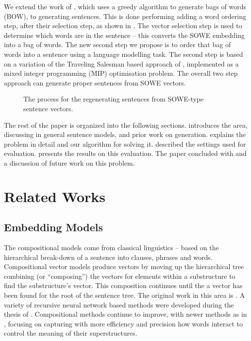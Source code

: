 \documentclass[11pt]{article}
\theoremstyle{plain}
\theoremstyle{definition}
\begin{document}
We extend the work of \textcite{White2015BOWgen}, which uses a greedy algorithm to generate bags of words (BOW), to generating sentences. This is done performing adding a word ordering step, after their selection step, as shown in . The vector selection step is used to determine which words are in the sentence -- this converts the SOWE embedding into a bag of words. The new second step we propose is to order that bag of words into a sentence using a language modelling task. The second step is based on a variation of the Traveling Salesman based approach of \cite{Horvat2014}, implemented as a mixed integer programming (MIP) optimisation problem. The overall two step approach can generate proper sentences from SOWE vectors.
\begin{figure}
	\centering 
	
	\caption{The process for the regenerating sentences from SOWE-type sentence vectors. }
	\label{block_diagram}
\end{figure}

The rest of the paper is organized into the following sections.  introduces the area, discussing in general sentence models, and prior work on generation.  explains the problem in detail and our algorithm for solving it.  described the settings used for evaluation.  presents the results on this evaluation. The paper concluded with  and a discussion of future work on this problem.


\section{Related Works}\label{relwork}
\subsection{Embedding Models}

The compositional models come from classical linguistics -- based on the hierarchical  break-down of a sentence into clauses, phrases and words. Compositional vector models produce vectors by moving up the hierarchical tree combining (or ``composing'') the vectors for elements within a substructure to find the substructure's vector. This composition continues until the a vector has been found for the root of the sentence tree. The original work in this area is \textcite{Mitchell2008}. A variety of recursive neural network based methods were developed during the thesis of \textcite{socher2014recursive}. Compositional methods continue to improve, with newer methods as in \textcite{TACL15CompVector}, focusing on capturing with more efficiency and precision how words interact to control the meaning of their superstructures. 
\end{document}
